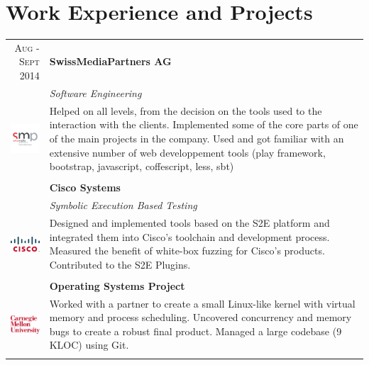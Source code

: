 \documentclass[a4paper,11pt]{article} %
\begin{document}

\section{Work Experience and Projects}

\begin{tabularx}{\textwidth}{r|X}
\textsc{Aug - Sept 2014} & \textbf{SwissMediaPartners AG} \\
\multirow{4}{*}{ \includegraphics[width=60pt]{img/smp.jpg}}
& \emph{Software Engineering}\\ 
& \footnotesize{Helped on all levels, from the decision on the tools used to the
interaction with the clients. Implemented some of the core parts of one of the
main projects in the company. Used and got familiar with an extensive number of
web developpement tools (play framework, bootstrap, javascript, coffescript,
less, sbt)}\\
\multicolumn{2}{c}{} \\


\textsc{Feb - Jul 2014} & \textbf{Cisco Systems} \\
\multirow{4}{*}{ \includegraphics[width=60pt]{img/cisco.eps}}
& \emph{Symbolic Execution Based Testing}\\ 
& \footnotesize{Designed and implemented tools based on the S2E platform and
integrated them into Cisco's toolchain and development process. Measured the
benefit of white-box fuzzing for Cisco's products. Contributed to the S2E
Plugins.}\\
\multicolumn{2}{c}{} \\


\textsc{Jan - May 2013} & \textbf{Operating Systems Project}\\
\multirow{3}{*}{ \includegraphics[width=55pt]{img/cmu.eps}}
& \footnotesize{Worked with a partner to create a small Linux-like kernel
with virtual memory and process scheduling. Uncovered concurrency and memory
bugs to create a robust final product. Managed a large codebase (9 KLOC) using Git.}\\
\multicolumn{2}{c}{} \\


\end{tabularx}
\end{document}
